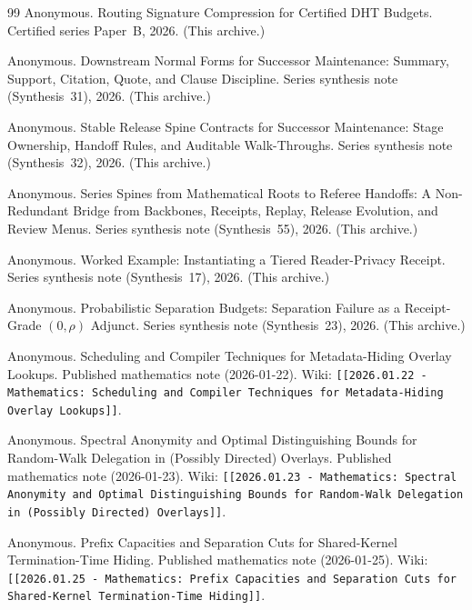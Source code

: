 \documentclass[11pt]{article}
\begin{document}
\begin{thebibliography}{99}
Anonymous.
\newblock Routing Signature Compression for Certified DHT Budgets.
\newblock Certified series Paper~B, 2026. (This archive.)

Anonymous.
\newblock Downstream Normal Forms for Successor Maintenance: Summary, Support, Citation, Quote, and Clause Discipline.
\newblock Series synthesis note (Synthesis~31), 2026. (This archive.)

Anonymous.
\newblock Stable Release Spine Contracts for Successor Maintenance: Stage Ownership, Handoff Rules, and Auditable Walk-Throughs.
\newblock Series synthesis note (Synthesis~32), 2026. (This archive.)

Anonymous.
\newblock Series Spines from Mathematical Roots to Referee Handoffs: A Non-Redundant Bridge from Backbones, Receipts, Replay, Release Evolution, and Review Menus.
\newblock Series synthesis note (Synthesis~55), 2026. (This archive.)

Anonymous.
\newblock Worked Example: Instantiating a Tiered Reader-Privacy Receipt.
\newblock Series synthesis note (Synthesis~17), 2026. (This archive.)

Anonymous.
\newblock Probabilistic Separation Budgets: Separation Failure as a Receipt-Grade $(0,\rho)$ Adjunct.
\newblock Series synthesis note (Synthesis~23), 2026. (This archive.)

Anonymous.
\newblock Scheduling and Compiler Techniques for Metadata-Hiding Overlay Lookups.
\newblock Published mathematics note (2026-01-22). Wiki: \texttt{[[2026.01.22 - Mathematics: Scheduling and Compiler Techniques for Metadata-Hiding Overlay Lookups]]}.

Anonymous.
\newblock Spectral Anonymity and Optimal Distinguishing Bounds for Random-Walk Delegation in (Possibly Directed) Overlays.
\newblock Published mathematics note (2026-01-23). Wiki: \texttt{[[2026.01.23 - Mathematics: Spectral Anonymity and Optimal Distinguishing Bounds for Random-Walk Delegation in (Possibly Directed) Overlays]]}.

Anonymous.
\newblock Prefix Capacities and Separation Cuts for Shared-Kernel Termination-Time Hiding.
\newblock Published mathematics note (2026-01-25). Wiki: \texttt{[[2026.01.25 - Mathematics: Prefix Capacities and Separation Cuts for Shared-Kernel Termination-Time Hiding]]}.


\end{thebibliography}
\end{document}
